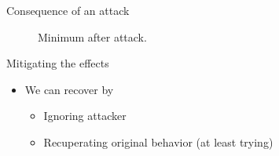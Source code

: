 \documentclass[aspectratio=169]{beamer}
\begin{document}
\begin{frame}{Consequence of an attack}
\begin{overlayarea}{\textwidth}{.5\textwidth}
\begin{minipage}[t]{.45\linewidth}
\begin{figure}[h]
            \caption*{Minimum after attack.}\label{fig:minimum_after_attack}
          \end{figure}
      \end{minipage}
  \end{overlayarea}
\end{frame}

\begin{frame}{Mitigating the effects}
  \vspace{-1.cm}
  \begin{overlayarea}{\textwidth}{.4\textwidth}
    \begin{itemize}[<+(1)->]
      \item We can recover by
            \begin{itemize}[<+(1)->]
              \item Ignoring attacker
              \item Recuperating original behavior (at least trying)
            \end{itemize}
    \end{itemize}
\end{overlayarea}
\end{frame}
\end{document}

